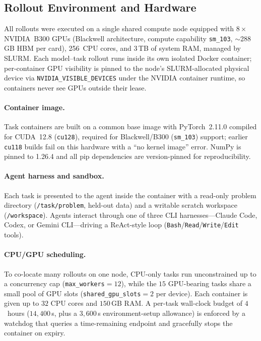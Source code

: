 \subsection{Rollout Environment and Hardware}
  \label{sec:rollout-env}

  All rollouts were executed on a single shared compute node equipped with
  $8\times$ NVIDIA~B300 GPUs (Blackwell architecture, compute capability
  \texttt{sm\_103}, $\sim$288\,GB HBM per card), 256~CPU cores, and 3\,TB of
  system RAM, managed by SLURM. Each model--task rollout runs inside its own
  isolated Docker container; per-container GPU visibility is pinned to the
  node's SLURM-allocated physical device via \texttt{NVIDIA\_VISIBLE\_DEVICES}
  under the NVIDIA container runtime, so containers never see GPUs outside their
  lease.

  \paragraph{Container image.}
  Task containers are built on a common base image with PyTorch~2.11.0
  compiled for CUDA~12.8 (\texttt{cu128}), required for Blackwell/B300
  (\texttt{sm\_103}) support; earlier \texttt{cu118} builds fail on this
  hardware with a ``no kernel image'' error. NumPy is pinned to 1.26.4 and all
  pip dependencies are version-pinned for reproducibility.

  \paragraph{Agent harness and sandbox.}
  Each task is presented to the agent inside the container with a read-only
  problem directory (\texttt{/task/problem}, held-out data) and a writable
  scratch workspace (\texttt{/workspace}). Agents interact through one of three
  CLI harnesses---Claude Code, Codex, or Gemini CLI---driving a ReAct-style
  loop (\texttt{Bash}/\texttt{Read}/\texttt{Write}/\texttt{Edit} tools). 
  
  \paragraph{CPU/GPU scheduling.}
  To co-locate many rollouts on one node, CPU-only tasks run unconstrained up to
  a concurrency cap (\texttt{max\_workers}$=12$), while the
  $15$ GPU-bearing tasks share a small pool of GPU slots
  (\texttt{shared\_gpu\_slots}$=2$ per device). Each container is given up to
  $32$ CPU cores and $150$\,GB RAM. A per-task wall-clock budget of $4$~hours
  ($14{,}400$\,s, plus a $3{,}600$\,s environment-setup allowance) is enforced by
  a watchdog that queries a time-remaining endpoint and gracefully stops the
  container on expiry.

